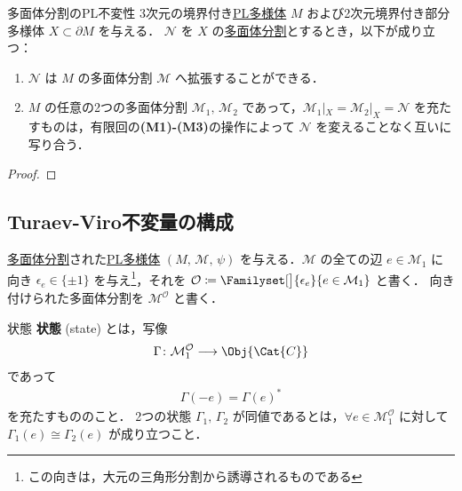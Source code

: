 \documentclass[TQFT_main]{subfiles}
\begin{document}
\begin{mytheo}[label=thm:polytope]{多面体分割のPL不変性}
    3次元の境界付き\hyperref[def:PLmfd]{PL多様体} $M$ および2次元境界付き部分多様体 $X \subset \partial M$ を与える．
    $\mathcal{N}$ を $X$ の\hyperref[def:polytope-decomp]{多面体分割}とするとき，以下が成り立つ：
    \begin{enumerate}
        \item $\mathcal{N}$ は $M$ の多面体分割 $\mathcal{M}$ へ拡張することができる．
        \item $M$ の任意の2つの多面体分割 $\mathcal{M}_1,\, \mathcal{M}_2$ であって，$\mathcal{M}_1|_{X} = \mathcal{M}_2|_X = \mathcal{N}$ を充たすものは，有限回の\textsf{\textbf{(M1)-(M3)}}の操作によって $\mathcal{N}$ を変えることなく互いに写り合う．
    \end{enumerate}
\end{mytheo}

\begin{proof}
    
\end{proof}

\subsection{Turaev-Viro不変量の構成}

\hyperref[def:polytope-decomp]{多面体分割}された\hyperref[def:PLmfd]{PL多様体} $(M,\, \mathcal{M},\, \psi)$ を与える．$\mathcal{M}$ の全ての辺 $e \in \mathcal{M}_1$ に向き $\epsilon_e \in \{\pm 1\}$ を与え\footnote{この向きは，大元の三角形分割から誘導されるものである}，それを $\mathcal{O} \coloneqq \Familyset[\big]{\epsilon_e}{e \in \mathcal{M}_1}$ と書く．
向き付けられた多面体分割を $\mathcal{M}^{\mathcal{O}}$ と書く．

\begin{mydef}[label=def:state]{状態}
    \textbf{状態} (state) とは，写像
    \begin{align}
        \Gamma \colon \mathcal{M}^{\mathcal{O}}_1 \lto \Obj{\Cat{C}}
    \end{align}
    であって
    \begin{align}
        \Gamma(-e) = \Gamma(e)^*
    \end{align}
    を充たすもののこと．
    \tcblower
    2つの状態 $\Gamma_1,\, \Gamma_2$ が同値であるとは，$\forall e \in \mathcal{M}^{\mathcal{O}}_1$ に対して $\Gamma_1(e) \cong \Gamma_2(e)$ が成り立つこと．
\end{mydef}
\end{document}
